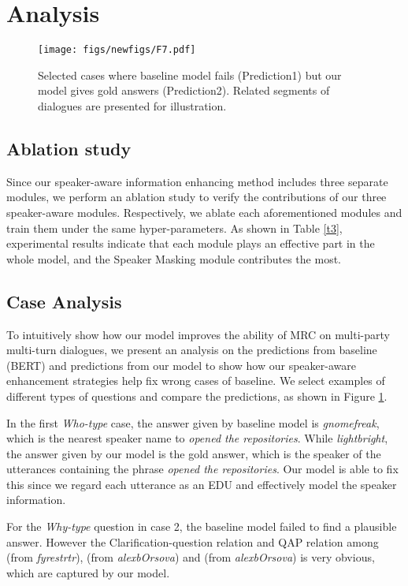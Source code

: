 \documentclass[letterpaper]{article} \usepackage{stylefile}  \usepackage{times}  \usepackage{helvet}  \usepackage{courier}  \usepackage[hyphens]{url}  \usepackage{graphicx} \urlstyle{rm} \def\UrlFont{\rm}  \usepackage{natbib}  \usepackage{caption} \DeclareCaptionStyle{ruled}{labelfont=normalfont,labelsep=colon,strut=off} \frenchspacing  \setlength{\pdfpagewidth}{8.5in}  \setlength{\pdfpageheight}{11in}  \usepackage{algorithm}
\begin{document}
\section{Analysis}

\begin{figure}[htb]
		\centering
		\texttt{[image: figs/newfigs/F7.pdf]}
		\caption{\label{case} Selected cases where baseline model fails (Prediction1) but our model gives gold answers (Prediction2). Related segments of dialogues are presented for illustration.}
\end{figure}

\subsection{Ablation study}
Since our speaker-aware information enhancing method includes three separate modules, we perform an ablation study to verify the contributions of our three speaker-aware modules. Respectively, we ablate each aforementioned modules and train them under the same hyper-parameters. As shown in Table \ref{t3}, experimental results indicate that each module plays an effective part in the whole model, and the Speaker Masking module contributes the most.




\subsection{Case Analysis}
To intuitively show how our model improves the ability of MRC on multi-party multi-turn dialogues, we present an analysis on the predictions from baseline (BERT) and predictions from our model to show how our speaker-aware enhancement strategies help fix wrong cases of baseline. 
We select examples of different types of questions and compare the predictions, as shown in Figure \ref{case}. 

In the first \emph{Who-type} case, the answer given by baseline model is \emph{gnomefreak}, which is the nearest speaker name to \emph{ opened the repositories}. While \emph{lightbright}, the answer given by our model is the gold answer, which is the speaker of the utterances containing the phrase \emph{opened the repositories}. Our model is able to fix this since we regard each utterance as an EDU and effectively model the speaker information. 

For the \emph{Why-type} question in case 2, the baseline model failed to find a plausible answer. However the Clarification-question relation and QAP relation among  (from \emph{fyrestrtr}),  (from \emph{alexbOrsova}) and  (from \emph{alexbOrsova}) is very obvious, which are captured by our model.
\end{document}
